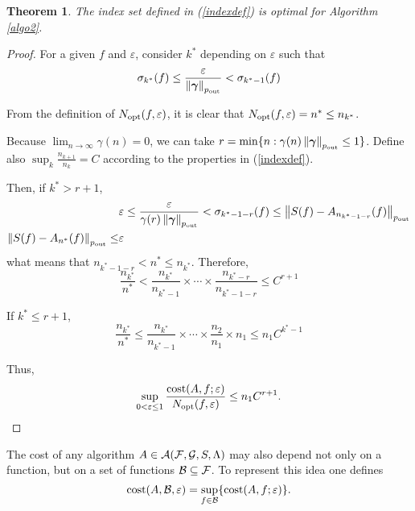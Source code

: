 \documentclass[final]{elsarticle}
\newcommand{\pout}{p_{\text{\rm{out}}}}
\newcommand{\bgamma}{\boldsymbol\gamma}
\newtheorem{theorem}{Theorem}
\theoremstyle{definition}
\theoremstyle{remark}
\begin{document}
\begin{theorem}\label{nopt}
The index set defined in (\ref{indexdef}) is optimal for Algorithm \ref{algo2}.
\end{theorem}
\begin{proof}
For a given $f$ and $\varepsilon$, consider $k^*$ depending on $\varepsilon$ such that
\begin{equation*}
\sigma_{k^*}(f) \le \frac{\varepsilon}{\norm[\pout]{\bgamma}} < \sigma_{k^*-1}(f)
\end{equation*}

From the definition of $N_{\operatorname{opt}}(f,\varepsilon)$, it is clear that $N_{\operatorname{opt}}(f,\varepsilon)=n^*\le n_{k^*}$.

Because $\lim_{n\rightarrow\infty}\gamma(n)=0$, we can take $r=\min\{n: \gamma(n)\norm[\pout]{\bgamma} \le 1\}$. Define also $\sup_k\frac{n_{k+1}}{n_k}=C$ according to the properties in (\ref{indexdef}).

Then, if $k^*>r+1$,
\begin{align*}
& \varepsilon \le \frac{\varepsilon}{\gamma(r)\norm[\pout]{\bgamma}} < \sigma_{k^*-1-r}(f) \le \norm[\pout]{S(f)-A_{n_{k^*-1-r}}(f)} \\
\norm[\pout]{S(f)-A_{n^*}(f)} \le & \varepsilon
\end{align*}
what means that $n_{k^*-1-r} < n^* \le n_{k^*}$. Therefore,
\begin{equation*}
\frac{n_{k^*}}{n^*} < \frac{n_{k^*}}{n_{k^*-1}}\times\cdots\times\frac{n_{k^*-r}}{n_{k^*-1-r}} \le C^{r+1}
\end{equation*}

If $k^* \le r+1$,
\begin{equation*}
\frac{n_{k^*}}{n^*} \le \frac{n_{k^*}}{n_{k^*-1}}\times\cdots\times\frac{n_{2}}{n_{1}}\times n_{1} \le n_{1}C^{k^*-1}
\end{equation*}

Thus,
\begin{equation*}
\sup_{0 < \varepsilon \le 1} \frac{\operatorname{cost}(A,f;\varepsilon)} {N_{\operatorname{opt}}(f,\varepsilon)} \le n_1C^{r+1}.
\end{equation*}
\end{proof}

The cost of any algorithm $A\in\mathcal{A}(\mathcal{F},\mathcal{G},S,\Lambda)$ may also depend not only on a function, but on a set of functions $\mathcal{B}\subseteq\mathcal{F}$. To represent this idea one defines
\begin{equation*}
\operatorname{cost}(A,\mathcal{B},\varepsilon)=\sup_{f\in\mathcal{B}}\{\operatorname{cost}(A,f;\varepsilon)\}.
\end{equation*}
\end{document}
